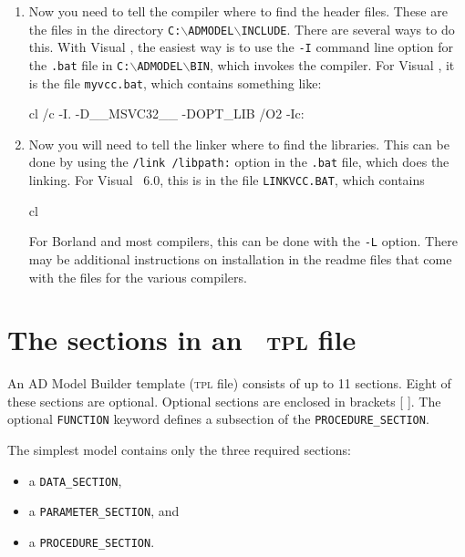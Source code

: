 \documentclass{admbmanual}
\newcommand\mybackslash{$\backslash$}
\newcommand\DS{\texttt{DATA\_SECTION}}
\newcommand\PS{\texttt{PARAMETER\_SECTION}}
\newcommand\PROS{\texttt{PROCEDURE\_SECTION}}
\begin{document}
\begin{enumerate}
\item Now you need to tell the compiler where to find
the \ADMS header files. These are the files in the
directory \texttt{C:\mybackslash ADMODEL\mybackslash INCLUDE}.
There are several ways to do this. With Visual \cplus,
the easiest way is to use the \texttt{-I} command line option
for the \texttt{.bat} file in
\texttt{C:\mybackslash ADMODEL\mybackslash BIN},
which invokes the compiler. For Visual \cplus, it is the file \texttt{myvcc.bat},
which contains something like:
\begin{smallcode}
  cl /c -I. -D__MSVC32__ -DOPT_LIB /O2 -Ic:\admodel{}\INCLUDE %
\end{smallcode}
\item Now you will need to tell the linker where to find the \ADMS libraries.
This can be done by using the \texttt{/link /libpath:} option in the \texttt{.bat} file, which does
the linking. For Visual \cplus\ 6.0, this is in the file \texttt{LINKVCC.BAT},
which contains
\begin{smallcode}
cl %
\end{smallcode}
For Borland and most compilers, this can be done with the \texttt{-L}
option. There may be additional instructions on installation in the
readme files that come with the \ADMS files for the various compilers.
\end{enumerate}


\section{The sections in an \ADMS\ \textsc{tpl} file}

An AD Model Builder template (\textsc{tpl} file) consists of up to 11 sections.
Eight of these sections are optional. Optional sections are 
enclosed in brackets [ ]. The optional \texttt{FUNCTION} keyword defines a 
subsection of the \PROS.

The simplest model contains only the three required sections:
\begin{itemize}
  \item a \DS,
  \item a \PS, and 
  \item a \PROS.
\end{itemize}
 
\end{document}
